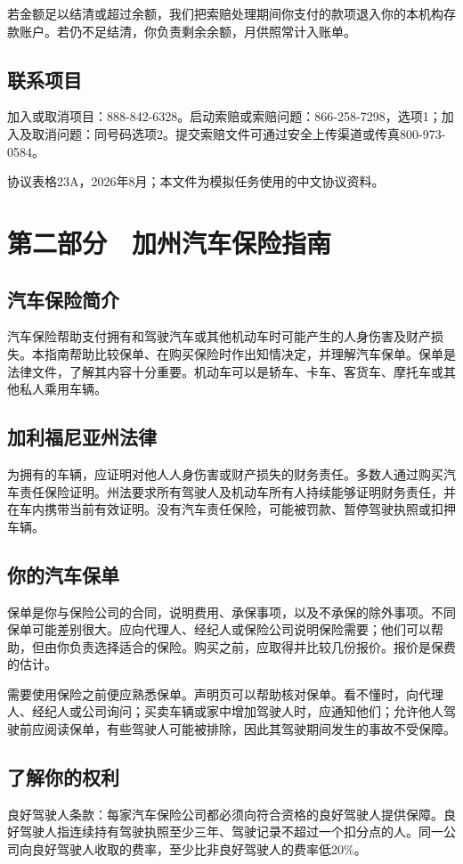\documentclass[UTF8,fontset=none,11pt,a4paper]{ctexart}
\begin{document}
若金额足以结清或超过余额，我们把索赔处理期间你支付的款项退入你的本机构存款账户。若仍不足结清，你负责剩余余额，月供照常计入账单。


\subsection*{联系项目}
加入或取消项目：888-842-6328。启动索赔或索赔问题：866-258-7298，选项1；加入及取消问题：同号码选项2。提交索赔文件可通过安全上传渠道或传真800-973-0584。


协议表格23A，2026年8月；本文件为模拟任务使用的中文协议资料。


\section*{第二部分　加州汽车保险指南}
\subsection*{汽车保险简介}
汽车保险帮助支付拥有和驾驶汽车或其他机动车时可能产生的人身伤害及财产损失。本指南帮助比较保单、在购买保险时作出知情决定，并理解汽车保单。保单是法律文件，了解其内容十分重要。机动车可以是轿车、卡车、客货车、摩托车或其他私人乘用车辆。


\subsection*{加利福尼亚州法律}
为拥有的车辆，应证明对他人人身伤害或财产损失的财务责任。多数人通过购买汽车责任保险证明。州法要求所有驾驶人及机动车所有人持续能够证明财务责任，并在车内携带当前有效证明。没有汽车责任保险，可能被罚款、暂停驾驶执照或扣押车辆。


\subsection*{你的汽车保单}
保单是你与保险公司的合同，说明费用、承保事项，以及不承保的除外事项。不同保单可能差别很大。应向代理人、经纪人或保险公司说明保险需要；他们可以帮助，但由你负责选择适合的保险。购买之前，应取得并比较几份报价。报价是保费的估计。


需要使用保险之前便应熟悉保单。声明页可以帮助核对保单。看不懂时，向代理人、经纪人或公司询问；买卖车辆或家中增加驾驶人时，应通知他们；允许他人驾驶前应阅读保单，有些驾驶人可能被排除，因此其驾驶期间发生的事故不受保障。


\subsection*{了解你的权利}
良好驾驶人条款：每家汽车保险公司都必须向符合资格的良好驾驶人提供保障。良好驾驶人指连续持有驾驶执照至少三年、驾驶记录不超过一个扣分点的人。同一公司向良好驾驶人收取的费率，至少比非良好驾驶人的费率低20\%。
\end{document}
